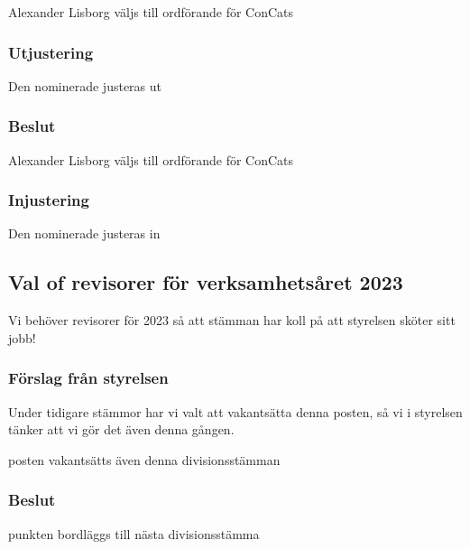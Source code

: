 \documentclass[protokoll]{dvd}
\begin{document}
        \begin{attsatser}
            \item Alexander Lisborg väljs till ordförande för ConCats
        \end{attsatser}

        \subsubsection*{Utjustering}
        Den nominerade justeras ut

        \subsubsection*{Beslut}
            \begin{attsatser}
                \item Alexander Lisborg väljs till ordförande för ConCats
            \end{attsatser}

        \subsubsection*{Injustering}
        Den nominerade justeras in

\subsection{Val of revisorer för verksamhetsåret 2023}
Vi behöver revisorer för 2023 så att stämman har koll på att styrelsen sköter sitt jobb!

        \subsubsection*{Förslag från styrelsen}
        Under tidigare stämmor har vi valt att vakantsätta denna posten, så vi i styrelsen tänker
        att vi gör det även denna gången.

            \begin{attsatser}
                \item posten vakantsätts även denna divisionsstämman
            \end{attsatser}

        \subsubsection*{Beslut}

        \begin{attsatser}
        \item punkten bordläggs till nästa divisionsstämma
        \end{attsatser}
\end{document}
